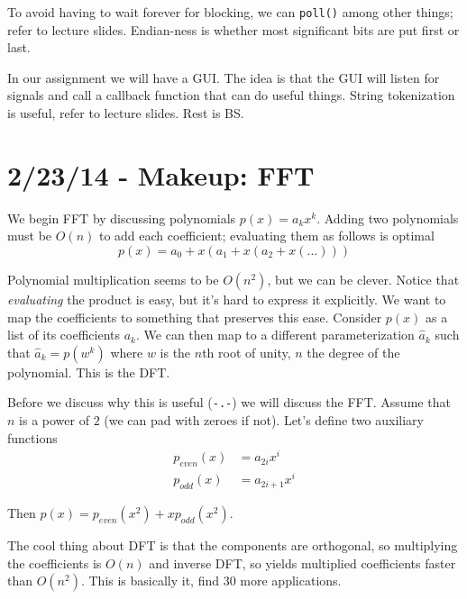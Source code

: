 \documentclass[10pt, twocolumn]{article}
\begin{document}
To avoid having to wait forever for blocking, we can \texttt{poll()} among other things; refer to lecture slides. Endian-ness is whether most significant bits are put first or last. 

In our assignment we will have a GUI. The idea is that the GUI will listen for signals and call a callback function that can do useful things. String tokenization is useful, refer to lecture slides. Rest is BS.
\section{2/23/14 - Makeup: FFT}

We begin FFT by discussing polynomials $p(x) = a_kx^k$. Adding two polynomials must be $O(n)$ to add each coefficient; evaluating them as follows is optimal
\begin{equation}
    p(x) = a_0 + x(a_1 + x(a_2 + x(\dots)))
\end{equation}

Polynomial multiplication seems to be $O(n^2)$, but we can be clever. Notice that \emph{evaluating} the product is easy, but it's hard to express it explicitly. We want to map the coefficients to something that preserves this ease. Consider $p(x)$ as a list of its coefficients $a_k$. We can then map to a different parameterization $\hat{a}_k$ such that $\hat{a}_k = p(w^k)$ where $w$ is the $n$th root of unity, $n$ the degree of the polynomial. This is the DFT.

Before we discuss why this is useful (\texttt{-.-}) we will discuss the FFT. Assume that $n$ is a power of $2$ (we can pad with zeroes if not). Let's define two auxiliary functions
\begin{align}
    p_{even}(x) &= a_{2i}x^i\\
    p_{odd}(x) &= a_{2i + 1}x^i
\end{align}

Then $p(x) = p_{even}(x^2) + xp_{odd}(x^2)$.

The cool thing about DFT is that the components are orthogonal, so multiplying the coefficients is $O(n)$ and inverse DFT, so yields multiplied coefficients faster than $O(n^2)$. This is basically it, find 30 more applications.
\end{document}
